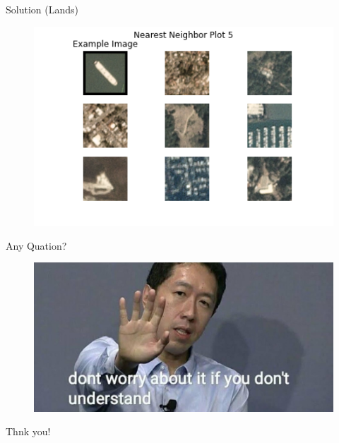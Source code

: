 \documentclass{beamer}
\begin{document}
\begin{frame}[t]{Solution (Lands)}
\begin{figure}
			\includegraphics[scale=0.2]{land4.png}
		\end{figure}
	\end{frame}
	\begin{frame}{Any Quation?}
		\begin{figure}
			\includegraphics[scale=0.3]{ng.jpg}
		\end{figure}
	\end{frame}

	
	\begin{frame}[standout]
		Thnk you!
	\end{frame}
\end{document}
